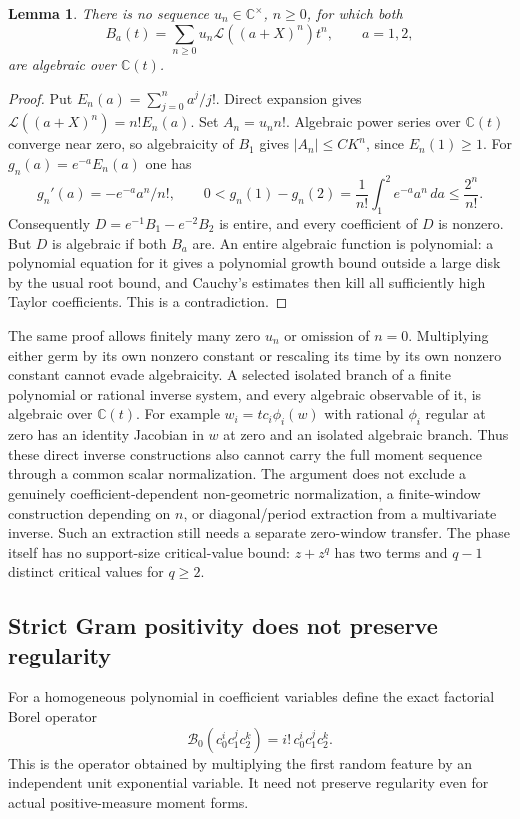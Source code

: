 \documentclass[11pt]{article}
\newtheorem{lemma}[proposition]{Lemma}
\newcommand{\Lfac}{\mathcal L}
\newcommand{\C}{\mathbb C}
\begin{document}
\begin{lemma}\label{lem:common-algebraic-normalization}
There is no sequence $u_n\in\C^\times$, $n\ge0$, for which both
\[
 B_a(t)=\sum_{n\ge0}u_n\Lfac((a+X)^n)t^n,\qquad a=1,2,
\]
are algebraic over $\C(t)$.
\end{lemma}
\begin{proof}
Put $E_n(a)=\sum_{j=0}^n a^j/j!$. Direct expansion gives
$\Lfac((a+X)^n)=n!E_n(a)$. Set $A_n=u_n n!$.
Algebraic power series over $\C(t)$ converge near zero, so algebraicity
of $B_1$ gives $|A_n|\le C K^n$, since $E_n(1)\ge1$.
For $g_n(a)=e^{-a}E_n(a)$ one has
\[
 g_n'(a)=-e^{-a}a^n/n!,\qquad
 0<g_n(1)-g_n(2)=\frac1{n!}\int_1^2 e^{-a}a^n\,da
 \le\frac{2^n}{n!}.
\]
Consequently $D=e^{-1}B_1-e^{-2}B_2$ is entire, and every
coefficient of $D$ is nonzero. But $D$ is algebraic if both $B_a$ are.
An entire algebraic function is polynomial: a polynomial equation for
it gives a polynomial growth bound outside a large disk by the usual
root bound, and Cauchy's estimates then kill all sufficiently high
Taylor coefficients. This is a contradiction.
\end{proof}

The same proof allows finitely many zero $u_n$ or omission of $n=0$.
Multiplying either germ by its own nonzero constant or rescaling its
time by its own nonzero constant cannot evade algebraicity.
A selected isolated branch of a finite polynomial or rational inverse
system, and every algebraic observable of it, is algebraic over
$\C(t)$. For example $w_i=t c_i\phi_i(w)$ with rational $\phi_i$
regular at zero has an identity Jacobian in $w$ at zero and an isolated
algebraic branch. Thus these direct inverse constructions also cannot
carry the full moment sequence through a common scalar normalization.
The argument does not exclude a genuinely coefficient-dependent
non-geometric normalization, a finite-window construction depending on
$n$, or diagonal/period extraction from a multivariate inverse.
Such an extraction still needs a separate zero-window transfer.
The phase itself has no support-size critical-value bound:
$z+z^q$ has two terms and $q-1$ distinct critical values for $q\ge2$.

\subsection{Strict Gram positivity does not preserve regularity}
For a homogeneous polynomial in coefficient variables define the exact
factorial Borel operator
\[
 \mathcal B_0(c_0^ic_1^jc_2^k)=i!\,c_0^ic_1^jc_2^k.
\]
This is the operator obtained by multiplying the first random feature
by an independent unit exponential variable. It need not preserve
regularity even for actual positive-measure moment forms.
\end{document}
